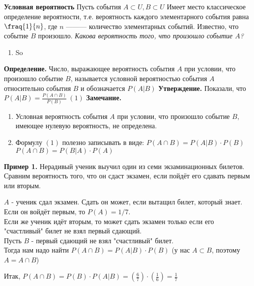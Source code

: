 \documentclass{article}
\begin{document}
    \subsection{}

    \textbf{Условная вероятность}
    Пусть события \(A \subset U, B \subset U \)
    Имеет место классическое определение вероятности, т.е. вероятность каждого элементарного события равна \(\fraq{1}{n}\),
где $n$ ——— количество элементарных событий.
Известно, что событие $B$ произошло.
\textit{Какова вероятность того, что произошло событие $A$?}
\begin{enumerate}
    \item So
\end{enumerate}

\textbf{Определение.} Число, выражающее вероятность события $A$ при условии, что произошло событие $B$, называется условной вероятностью события $A$ относительно события $B$ и обозначается \(P(A|B)\)
\textbf{Утверждение.} Показали, что \(P(A|B) = \frac{P(A \cap B)}{P(B)} \ (1)\)
\textbf{Замечание.}
\begin{enumerate}
    \item Условная вероятность события $A$ при условии, что произошло событие $B$, имеющее нулевую вероятность, не определена.
    \item Формулу $(1)$ полезно записывать в виде: \(P(A \cap B) = P(A|B) \cdot P(B)\)  \(P(A \cap B) = P(B|A) \cdot P(A)\)
\end{enumerate}
\textbf{Пример 1.} Нерадивый ученик выучил один из семи экзаминационных билетов. Сравним вероятность того, что он сдаст экзамен, если пойдёт его сдавать первым или вторым.

$A$ - ученик сдал экзамен. Сдать он может, если вытащил билет, который знает.\\
Если он войдёт первым, то \(P(A)=1/7\).\\
Если же ученик идёт вторым, то может сдать экзамен только если его "счастливый" билет не взял первый сдающий.\\
Пусть $B$ - первый сдающий не взял "счастливый" билет.\\
Тогда нам надо найти \(P(A \cap B) = P(A|B) \cdot P(B)\) (у нас \(A \subset B\), поэтому \(A = A \cap B\))


Итак, \(P(A \cap B) = P(B) \cdot P(A|B) = (\frac{6}{7}) \cdot (\frac{1}{6}) = \frac{1}{7}\)

    
\end{document}
